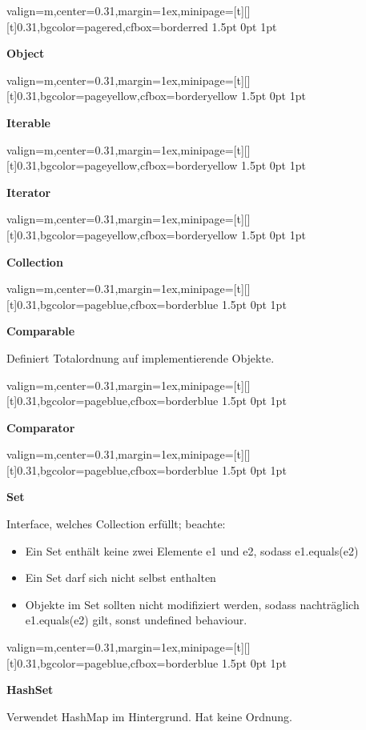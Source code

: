 \documentclass[11pt, a4paper, landscape]{article}
\newcommand{\fancyheader}[1]{
	\centerline{\sffamily \textbf{ \large #1}}
}
\newenvironment{fancybox}[2]
{
	\begin{adjustbox}{valign=m,center=0.31\textwidth,margin=1ex,minipage=[t][][t]{0.31\textwidth},bgcolor=#1,cfbox=#2 1.5pt 0pt 1pt}
	\begin{centering}
}
{
	\end{centering}
	\end{adjustbox}
}
\begin{document}

\begin{multicols}{3}
\raggedcolumns

\begin{fancybox}{pagered}{borderred}
\fancyheader{Object}

\end{fancybox}

\begin{fancybox}{pageyellow}{borderyellow}
\fancyheader{Iterable}

\end{fancybox}

\begin{fancybox}{pageyellow}{borderyellow}
\fancyheader{Iterator}

\end{fancybox}

\begin{fancybox}{pageyellow}{borderyellow}
\fancyheader{Collection}

\end{fancybox}

\begin{fancybox}{pageblue}{borderblue}
\fancyheader{Comparable}
\raggedright{
Definiert Totalordnung auf implementierende Objekte.
}

\end{fancybox}

\begin{fancybox}{pageblue}{borderblue}
\fancyheader{Comparator}

\end{fancybox}

\begin{fancybox}{pageblue}{borderblue}
\fancyheader{Set}


Interface, welches Collection erfüllt; beachte:
\begin{itemize}
\item Ein Set enthält keine zwei Elemente e1 und e2, sodass e1.equals(e2)
\item Ein Set darf sich nicht selbst enthalten
\item Objekte im Set sollten nicht modifiziert werden, sodass nachträglich e1.equals(e2) gilt, sonst undefined behaviour.
\end{itemize}
\end{fancybox}

\begin{fancybox}{pageblue}{borderblue}
\fancyheader{HashSet}

\raggedright{
	Verwendet HashMap im Hintergrund. Hat keine Ordnung.
}
\end{fancybox}


\end{multicols}
\end{document}
